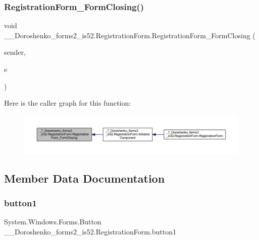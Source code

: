 \subsubsection{\texorpdfstring{Registration\+Form\+\_\+\+Form\+Closing()}{RegistrationForm\_FormClosing()}}
{\footnotesize\ttfamily void \+\_\+\_\+\+Doroshenko\+\_\+forms2\+\_\+is52.\+Registration\+Form.\+Registration\+Form\+\_\+\+Form\+Closing (\begin{DoxyParamCaption}\item[{object}]{sender,  }\item[{Form\+Closing\+Event\+Args}]{e }\end{DoxyParamCaption})\hspace{0.3cm}{\ttfamily [private]}}

Here is the caller graph for this function\+:
\nopagebreak
\begin{figure}[H]
\begin{center}
\leavevmode
\includegraphics[width=350pt]{class__7___doroshenko__forms2__is52_1_1_registration_form_acbf3a620ac8cab4171de994132465912_icgraph}
\end{center}
\end{figure}


\subsection{Member Data Documentation}
\hypertarget{class__7___doroshenko__forms2__is52_1_1_registration_form_a0969f7dda97cb1a0774ba82cf50d937d}{}\label{class__7___doroshenko__forms2__is52_1_1_registration_form_a0969f7dda97cb1a0774ba82cf50d937d} 
\subsubsection{\texorpdfstring{button1}{button1}}
{\footnotesize\ttfamily System.\+Windows.\+Forms.\+Button \+\_\+\_\+\+Doroshenko\+\_\+forms2\+\_\+is52.\+Registration\+Form.\+button1\hspace{0.3cm}{\ttfamily [private]}}

